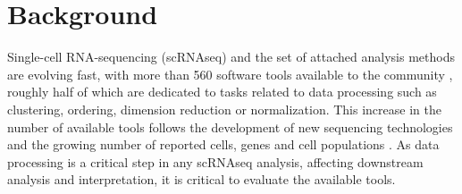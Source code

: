 \documentclass{bmcart}
\begin{document}


\section*{Background}

Single-cell RNA-sequencing (scRNAseq) and the set of attached analysis methods are evolving fast, with more than 560 software tools available to the community \cite{ZappiaDB2018}, roughly half of which are dedicated to tasks related to data processing such as clustering, ordering, dimension reduction or normalization. This increase in the number of available tools follows the development of new sequencing technologies and the growing number of reported cells, genes and cell populations \cite{SvenssonDB2019}. As data processing is a critical step in any scRNAseq analysis, affecting downstream analysis and interpretation, it is critical to evaluate the available tools.
\end{document}
